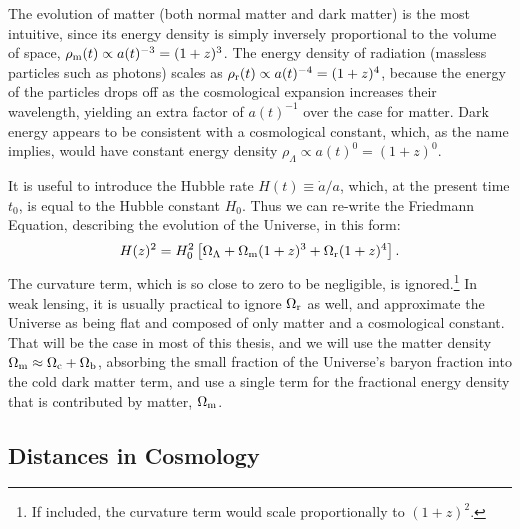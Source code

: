 The evolution of matter (both normal matter and dark matter) is the most intuitive, since its energy density is simply inversely proportional to the volume of space, $\rho_{\rm m}(t) \propto a(t)^{-3} = (1+z)^{3}$. The energy density of radiation (massless particles such as photons) scales as $\rho_{\rm r}(t) \propto a(t)^{-4} = (1+z)^{4}$, because the energy of the particles drops off as the cosmological expansion increases their wavelength, yielding an extra factor of $a(t)^{-1}$ over the case for matter. Dark energy appears to be consistent with a cosmological constant, which, as the name implies, would have constant energy density $\rho_{\Lambda} \propto a(t)^{0} = (1+z)^{0}$.

It is useful to introduce the Hubble rate $H(t) \equiv {\dot a}/a$, which, at the present time $t_0$, is equal to the Hubble constant $H_0$. Thus we can re-write the Friedmann Equation, describing the evolution of the Universe, in this form:
\begin{equation}
H(z)^2 = H_0^2 \left[ \Omega_{\Lambda} + \Omega_{\rm m}(1+z)^3 + \Omega_{\rm r} (1+z)^4 \right].
\end{equation}
The curvature term, which is so close to zero to be negligible, is ignored.\footnote{If included, the curvature term would scale proportionally to $(1+z)^2$.} In weak lensing, it is usually practical to ignore $\Omega_{\rm r}$ as well, and approximate the Universe as being flat and composed of only matter and a cosmological constant. That will be the case in most of this thesis, and we will use the matter density $\Omega_{\rm m} \approx \Omega_{\rm c} + \Omega_{\rm b}$, absorbing the small fraction of the Universe's baryon fraction into the cold dark matter term, and use a single term for the fractional energy density that is contributed by matter, $\Omega_{\rm m}$. 



\subsection{Distances in Cosmology}
\label{sec:distances}

